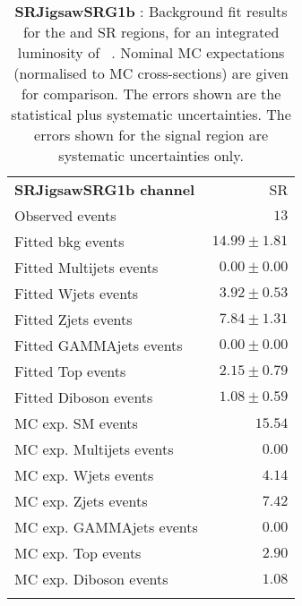 

\begin{table}
\begin{center}
\setlength{\tabcolsep}{0.0pc}
{\tiny
\begin{tabular*}{\textwidth}{@{\extracolsep{\fill}}lr}
\noalign{\smallskip}\hline\noalign{\smallskip}
{\bf SRJigsawSRG1b channel}           & SR              \\[-0.05cm]
\noalign{\smallskip}\hline\noalign{\smallskip}
Observed events          & $13$                    \\
\noalign{\smallskip}\hline\noalign{\smallskip}
Fitted bkg events         & $14.99 \pm 1.81$              \\
\noalign{\smallskip}\hline\noalign{\smallskip}
        Fitted Multijets events         & $0.00 \pm 0.00$              \\
        Fitted Wjets events         & $3.92 \pm 0.53$              \\
        Fitted Zjets events         & $7.84 \pm 1.31$              \\
        Fitted GAMMAjets events         & $0.00 \pm 0.00$              \\
        Fitted Top events         & $2.15 \pm 0.79$              \\
        Fitted Diboson events         & $1.08 \pm 0.59$              \\
 \noalign{\smallskip}\hline\noalign{\smallskip}
MC exp. SM events              & $15.54$              \\
\noalign{\smallskip}\hline\noalign{\smallskip}
        MC exp. Multijets events         & $0.00$              \\
        MC exp. Wjets events         & $4.14$              \\
        MC exp. Zjets events         & $7.42$              \\
        MC exp. GAMMAjets events         & $0.00$              \\
        MC exp. Top events         & $2.90$              \\
        MC exp. Diboson events         & $1.08$              \\
\noalign{\smallskip}\hline\noalign{\smallskip}
\end{tabular*}
}
\end{center}
\caption{{\bf SRJigsawSRG1b} : Background fit results for the  and SR regions, for an integrated luminosity of \ourintlumi~\ifb. Nominal MC expectations (normalised to MC cross-sections) are given for comparison. The errors shown are the statistical plus systematic uncertainties. The errors shown for the signal region are systematic uncertainties only.}
\label{table.results.systematics.in.logL.fit.SR.SRJigsawSRG1b}
\end{table}
%